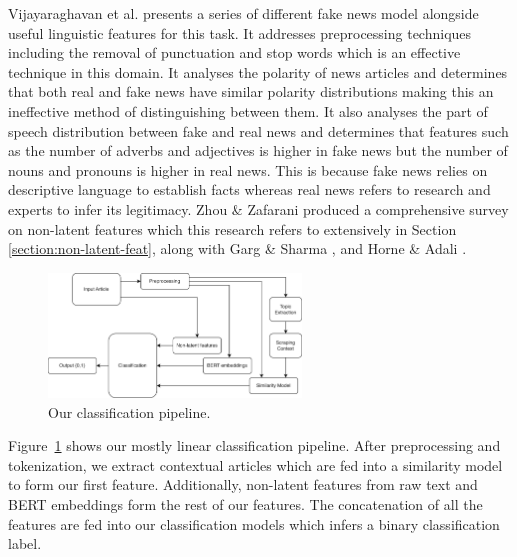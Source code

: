 \documentclass{article}
\begin{document}
Vijayaraghavan et al. \cite{vijayaraghavan2020fake} presents a series of different fake news model alongside useful linguistic features for this task. It addresses preprocessing techniques including the removal of punctuation and stop words which is an effective technique in this domain. It analyses the polarity of news articles and determines that both real and fake news have similar polarity distributions making this an ineffective method of distinguishing between them. It also analyses the part of speech distribution between fake and real news and determines that features such as the number of adverbs and adjectives is higher in fake news but the number of nouns and pronouns is higher in real news. This is because fake news relies on descriptive language to establish facts whereas real news refers to research and experts to infer its legitimacy. Zhou \& Zafarani \cite{zhou2020survey} produced a comprehensive survey on non-latent features which this research refers to extensively in Section \ref{section:non-latent-feat}, along with Garg \& Sharma \cite{garg2022linguistic}, and Horne \& Adali \cite{horne2017}.


\begin{minipage}{\textwidth}
  \begin{figure}
    \vspace*{-20pt}
    \centering
    \includegraphics[width=0.6\textwidth]{img/pipeline.png}
    \caption{Our classification pipeline.}
    \label{pipeline}
  \end{figure}

  Figure~\ref{pipeline} shows our mostly linear classification pipeline. After preprocessing and tokenization, we extract contextual articles which are fed into a similarity model to form our first feature. Additionally, non-latent features from raw text and BERT embeddings form the rest of our features. The concatenation of all the features are fed into our classification models which infers a binary classification label.
\end{minipage}
\end{document}
